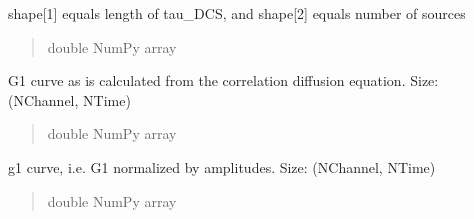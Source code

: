 \documentclass[letterpaper,10pt,english]{sphinxmanual}
\begin{document}
\begin{fulllineitems}
\begin{fulllineitems}
\sphinxAtStartPar
shape{[}\sphinxhyphen{}1{]} equals length of tau\_DCS, and shape{[}\sphinxhyphen{}2{]} equals number of sources
\begin{quote}\begin{description}
\sphinxAtStartPar
double NumPy array

\end{description}\end{quote}

\end{fulllineitems}


\begin{fulllineitems}
\label{\detokenize{_autosummary/nirfasterff.base.data.DCSdata:nirfasterff.base.data.DCSdata.G1_DCS}}
\pysigstartsignatures
\pysigline
{}
\pysigstopsignatures
\sphinxAtStartPar
G1 curve as is calculated from the correlation diffusion equation. Size: (NChannel, NTime)
\begin{quote}\begin{description}
\sphinxAtStartPar
double NumPy array

\end{description}\end{quote}

\end{fulllineitems}


\begin{fulllineitems}
\label{\detokenize{_autosummary/nirfasterff.base.data.DCSdata:nirfasterff.base.data.DCSdata.g1_DCS}}
\pysigstartsignatures
\pysigline
{}
\pysigstopsignatures
\sphinxAtStartPar
g1 curve, i.e. G1 normalized by amplitudes. Size: (NChannel, NTime)
\begin{quote}\begin{description}
\sphinxAtStartPar
double NumPy array

\end{description}\end{quote}

\end{fulllineitems}



\end{fulllineitems}
\end{document}
